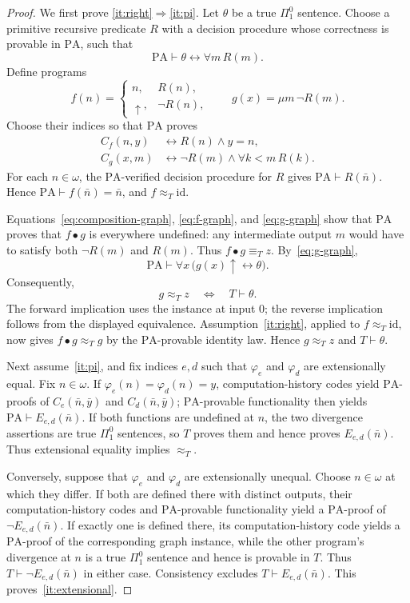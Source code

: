 \documentclass[11pt]{article}
\newcommand{\PA}{\mathrm{PA}}
\begin{document}
\begin{proof}
We first prove \ref{it:right}$\Rightarrow$\ref{it:pi}.
Let $\theta$ be a true $\Pi^0_1$ sentence.  Choose a primitive recursive
predicate $R$ with a decision procedure whose correctness is provable
in $\PA$, such that
\[
 \PA\vdash\theta\longleftrightarrow\forall m\,R(m).
\]
Define programs
\[
 f(n)=
 \begin{cases}
 n,&R(n),\\
 \uparrow,&\neg R(n),
 \end{cases}
 \qquad
 g(x)=\mu m\,\neg R(m).
\]
Choose their indices so that $\PA$ proves
\begin{align}
 C_f(n,y)&\longleftrightarrow R(n)\land y=n,
 \label{eq:f-graph}\\
 C_g(x,m)&\longleftrightarrow
        \neg R(m)\land\forall k<m\,R(k).
 \label{eq:g-graph}
\end{align}
For each $n\in\omega$, the $\PA$-verified decision procedure for $R$ gives
$\PA\vdash R(\bar n)$. Hence
$\PA\vdash f(\bar n)=\bar n$, and $f\approx_T\mathrm{id}$.

Equations~\eqref{eq:composition-graph}, \eqref{eq:f-graph}, and
\eqref{eq:g-graph} show that
$\PA$ proves that $f\bullet g$ is everywhere undefined:
any intermediate output $m$ would have to satisfy both $\neg R(m)$
and $R(m)$. Thus $f\bullet g\equiv_Tz$.
By~\eqref{eq:g-graph},
\[
 \PA\vdash\forall x\,
 \bigl(g(x)\uparrow\longleftrightarrow\theta\bigr).
\]
Consequently,
\[
 g\approx_Tz\quad\Longleftrightarrow\quad T\vdash\theta.
\]
The forward implication uses the instance at input $0$;
the reverse implication follows from the displayed equivalence.
Assumption~\ref{it:right}, applied to
$f\approx_T\mathrm{id}$, now gives $f\bullet g\approx_Tg$ by the
$\PA$-provable identity law. Hence $g\approx_Tz$ and $T\vdash\theta$.

Next assume~\ref{it:pi}, and fix indices $e,d$ such that $\varphi_e$ and
$\varphi_d$ are extensionally equal. Fix $n\in\omega$. If
$\varphi_e(n)=\varphi_d(n)=y$, computation-history codes yield $\PA$-proofs
of $C_e(\bar n,\bar y)$ and $C_d(\bar n,\bar y)$; $\PA$-provable functionality
then yields $\PA\vdash E_{e,d}(\bar n)$. If both functions are undefined at
$n$, the two divergence assertions are true $\Pi^0_1$ sentences, so $T$
proves them and hence proves $E_{e,d}(\bar n)$. Thus extensional equality
implies $\approx_T$.

Conversely, suppose that $\varphi_e$ and $\varphi_d$ are extensionally
unequal. Choose $n\in\omega$ at which they differ. If both are defined there
with distinct outputs, their computation-history codes and $\PA$-provable
functionality yield a $\PA$-proof of $\neg E_{e,d}(\bar n)$. If exactly one
is defined there, its computation-history code yields a $\PA$-proof of the
corresponding graph instance, while the other program's divergence at $n$ is
a true $\Pi^0_1$ sentence and hence is provable in $T$. Thus
$T\vdash\neg E_{e,d}(\bar n)$ in either case. Consistency excludes
$T\vdash E_{e,d}(\bar n)$.
This proves~\ref{it:extensional}.


\end{proof}
\end{document}
